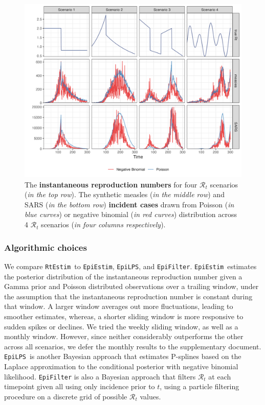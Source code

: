 \documentclass[10pt,letterpaper]{article}
\def\RtEstim{\texttt{RtEstim}}
\def\EpiEstim{\texttt{EpiEstim}}
\def\EpiLPS{\texttt{EpiLPS}}
\def\EpiFilter{\texttt{EpiFilter}}
\def\calR{\mathcal{R}}
\begin{document}
\begin{figure}[!ht]
  \centering
  \includegraphics[width=1.0\textwidth]{fig/fig_samples.png}
  \caption{The \textbf{instantaneous reproduction numbers} for four $\calR_t$ scenarios (\textit{in the top row}). 
  The synthetic measles (\textit{in the middle row}) and SARS (\textit{in the bottom row}) \textbf{incident cases} drawn 
  from Poisson (\textit{in blue curves}) or negative binomial (\textit{in red curves}) distribution 
  across 4 $\calR_t$ scenarios (\textit{in four columns respectively}).} 
  \label{fig:samples}
\end{figure}

\subsubsection{Algorithmic choices}

We compare \RtEstim\ to \EpiEstim, \EpiLPS, and \EpiFilter. \EpiEstim\ estimates
the posterior distribution of the instantaneous reproduction number given a
Gamma prior and Poisson distributed observations over a trailing window, under
the assumption that the instantaneous reproduction number is constant during
that window. A larger window averages out more fluctuations, leading to smoother
estimates, whereas, a shorter sliding window is more responsive to sudden spikes
or declines. We tried the weekly sliding window, as well as a monthly window.
However, since neither considerably outperforms the other across all scenarios,
we defer the monthly results to the supplementary document. \EpiLPS\ is another
Bayesian approach that estimates P-splines based on the Laplace approximation to
the conditional posterior with negative binomial likelihood. \texttt{EpiFilter}
is also a Bayesian approach that filters $\calR_t$ at each timepoint given all
using only incidence prior to $t$, using a particle filtering procedure on a
discrete grid of possible $\calR_t$ values.
\end{document}
